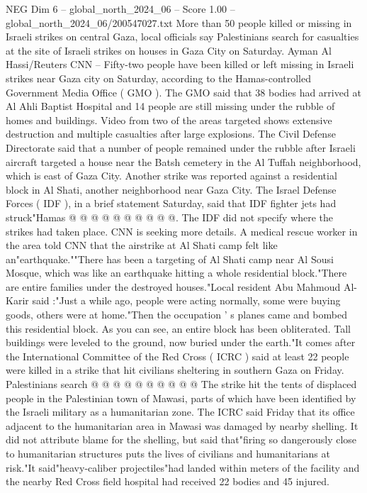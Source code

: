 \begin{textsample}{NEG Dim 6 – global\_north\_2024\_06 – Score 1.00 – global\_north\_2024\_06/200547027.txt}  \label{ex:f6_neg_314}
More than 50 people killed or missing in Israeli strikes on central Gaza, local officials say Palestinians search for casualties at the site of Israeli strikes on houses in Gaza City on Saturday.
Ayman Al Hassi/Reuters CNN -- Fifty-two people have been killed or left missing in Israeli strikes near Gaza city on Saturday, according to the Hamas-controlled Government Media Office ( GMO ).
The GMO said that 38 bodies had arrived at Al Ahli Baptist Hospital and 14 people are still missing under the rubble of homes and buildings.
Video from two of the areas targeted shows extensive destruction and multiple casualties after large explosions.
The Civil Defense Directorate said that a number of people remained under the rubble after Israeli aircraft targeted a house near the Batsh cemetery in the Al Tuffah neighborhood, which is east of Gaza City.
Another strike was reported against a residential block in Al Shati, another neighborhood near Gaza City.
The Israel Defense Forces ( IDF ), in a brief statement Saturday, said that IDF fighter jets had struck"Hamas @ @ @ @ @ @ @ @ @ @.
The IDF did not specify where the strikes had taken place.
CNN is seeking more details.
A medical rescue worker in the area told CNN that the airstrike at Al Shati camp felt like an"earthquake.""There has been a targeting of Al Shati camp near Al Sousi Mosque, which was like an earthquake hitting a whole residential block."There are entire families under the destroyed houses."Local resident Abu Mahmoud Al-Karir said :"Just a while ago, people were acting normally, some were buying goods, others were at home."Then the occupation ' s planes came and bombed this residential block.
As you can see, an entire block has been obliterated.
Tall buildings were leveled to the ground, now buried under the earth."It comes after the International Committee of the Red Cross ( ICRC ) said at least 22 people were killed in a strike that hit civilians sheltering in southern Gaza on Friday.
Palestinians search @ @ @ @ @ @ @ @ @ @ The strike hit the tents of displaced people in the Palestinian town of Mawasi, parts of which have been identified by the Israeli military as a humanitarian zone.
The ICRC said Friday that its office adjacent to the humanitarian area in Mawasi was damaged by nearby shelling.
It did not attribute blame for the shelling, but said that"firing so dangerously close to humanitarian structures puts the lives of civilians and humanitarians at risk."It said"heavy-caliber projectiles"had landed within meters of the facility and the nearby Red Cross field hospital had received 22 bodies and 45 injured.

\end{textsample}
